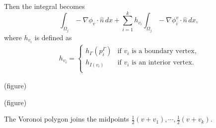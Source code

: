 Then the integral becomes
\begin{equation}\label{fvm_integral_vertex}
    \int_{\Omega_j}-\nabla\phi_v\cdot\hat{n}\,dx + \sum_{i=1}^{k}h_{v_i}\int_{\Omega_j}-\nabla\phi^v_i\cdot\hat{n}\,dx,
\end{equation}
where $h_{v_i}$ is defined as
\begin{align*}
    h_{v_i} =
    \left\{\begin{array}{lr}
        h_\Gamma(p^\Gamma_i) &\text{if $v_i$ is a boundary vertex,}\\
        h_{I(v_i)} &\text{if $v_i$ is an interior vertex}.\\
        \end{array}\right.
\end{align*}

\vskip 0.2in
(figure)
\vskip 0.2in

\vskip 0.2in
(figure)
\vskip 0.2in





The Voronoi polygon joins the midpoints $\frac{1}{2}(v + v_1),\cdots,\frac{1}{2}(v + v_k)$.




